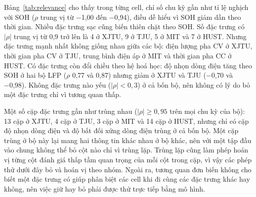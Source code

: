 Bảng~\ref{tab:relevance} cho thấy trong từng cell, chỉ số chu kỳ gần như tỉ lệ nghịch với SOH ($\rho$ trung vị từ −1{,}00 đến −0{,}94), điều dễ hiểu vì SOH giảm dần theo thời gian. Nhiều đặc trưng sạc cũng biến thiên chặt theo SOH. Số đặc trưng có $|\rho|$ trung vị từ 0,9 trở lên là 4 ở XJTU, 9 ở TJU, 5 ở MIT và 7 ở HUST. Nhưng đặc trưng mạnh nhất không giống nhau giữa các bộ: điện lượng pha CV ở XJTU, thời gian pha CV ở TJU, trung bình điện áp ở MIT và thời gian pha CC ở HUST. Có đặc trưng còn đổi chiều theo hệ hoá học: độ nhọn dòng điện tăng theo SOH ở hai bộ LFP ($\rho$ 0{,}77 và 0{,}87) nhưng giảm ở XJTU và TJU (−0{,}70 và −0{,}98). Không đặc trưng nào yếu ($|\rho| < 0{,}3$) ở cả bốn bộ, nên không có lý do bỏ một đặc trưng chỉ vì tương quan thấp.

Một số cặp đặc trưng gần như trùng nhau ($|\rho| \ge 0{,}95$ trên mọi chu kỳ của bộ): 13 cặp ở XJTU, 4 cặp ở TJU, 3 cặp ở MIT và 14 cặp ở HUST, nhưng chỉ có cặp độ nhọn dòng điện và độ bất đối xứng dòng điện trùng ở cả bốn bộ. Một cặp trùng ở bộ này lại mang hai thông tin khác nhau ở bộ khác, nên với một tập đầu vào chung không thể bỏ cột nào chỉ vì trùng lặp. Trùng lặp cũng làm phép hoán vị từng cột đánh giá thấp tầm quan trọng của mỗi cột trong cặp, vì vậy các phép thử dưới đây bỏ và hoán vị theo nhóm. Ngoài ra, tương quan đơn biến không cho biết một đặc trưng có giúp phân biệt các cell khi đi cùng các đặc trưng khác hay không, nên việc giữ hay bỏ phải được thử trực tiếp bằng mô hình.

